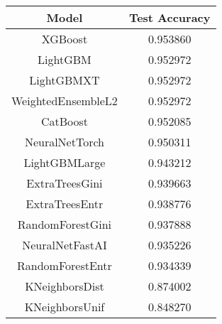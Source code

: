 \footnotesize
\begin{tabular}{cc}
\toprule
Model & Test Accuracy \\
\midrule
XGBoost & 0.953860 \\
LightGBM & 0.952972 \\
LightGBMXT & 0.952972 \\
WeightedEnsembleL2 & 0.952972 \\
CatBoost & 0.952085 \\
NeuralNetTorch & 0.950311 \\
LightGBMLarge & 0.943212 \\
ExtraTreesGini & 0.939663 \\
ExtraTreesEntr & 0.938776 \\
RandomForestGini & 0.937888 \\
NeuralNetFastAI & 0.935226 \\
RandomForestEntr & 0.934339 \\
KNeighborsDist & 0.874002 \\
KNeighborsUnif & 0.848270 \\
\bottomrule
\end{tabular}

\normalsize